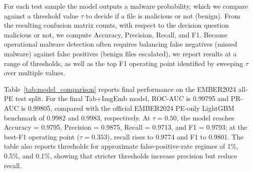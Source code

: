 \documentclass[conference]{IEEEtran}
\begin{document}

For each test sample the model outputs a malware probability, which we compare against a threshold value $\tau$ to decide if a file is malicious or not (benign).
From the resulting confusion matrix counts, with respect to the decision question malicious or not, we compute Accuracy, Precision, Recall, and F1.
Because operational malware detection often requires balancing false negatives (missed malware) against false positives (benign files escalated), we report results at a range of thresholds, as well as the top F1 operating point identified by sweeping $\tau$ over multiple values.


Table~\ref{tab:model_comparison} reports final performance on the EMBER2024 all-PE test split.
For the final Tab+ImgEmb model, ROC-AUC is 0.99795 and PR-AUC is 0.99805, compared with the official EMBER2024 PE-only LightGBM benchmark of 0.9982 and 0.9983, respectively.
At $\tau=0.50$, the model reaches Accuracy = 0.9795, Precision = 0.9875, Recall = 0.9713, and F1 = 0.9793; at the best-F1 operating point ($\tau=0.353$), recall rises to 0.9774 and F1 to 0.9801.
The table also reports thresholds for approximate false-positive-rate regimes of 1\%, 0.5\%, and 0.1\%, showing that stricter thresholds increase precision but reduce recall.
\end{document}
